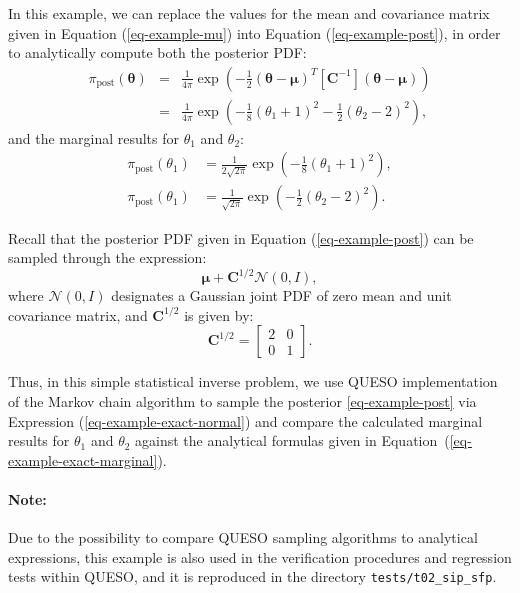 In this example, we can replace the values for the mean and covariance matrix given in Equation (\ref{eq-example-mu}) into Equation (\ref{eq-example-post}), 
in order to analytically compute both the posterior PDF:
\begin{eqnarray*}\label{eq-example-exact-post}
\pi_{\text{post}}(\boldsymbol{\theta}) & = & \frac{1}{4\pi} \exp\left(-\frac{1}{2}(\boldsymbol{\theta}-\boldsymbol{\mu})^T[\mathbf{C}^{-1}](\boldsymbol{\theta}-\boldsymbol{\mu})\right) \\
                                       & = & \frac{1}{4\pi} \exp\left( -\frac{1}{8}(\theta_1+1)^2 - \frac{1}{2}(\theta_2-2)^2\right), \label{eq-example-exact-joint}
\end{eqnarray*}
and the marginal results for $\theta_1$ and $\theta_2$:
\begin{equation}\label{eq-example-exact-marginal}
\begin{split}
\pi_{\text{post}}(\theta_1) & =  \frac{1}{2\sqrt{2\pi}} \exp\left(-\frac{1}{8}(\theta_1+1)^2 \right), \\
\pi_{\text{post}}(\theta_1) & =  \frac{1}{ \sqrt{2\pi}} \exp\left(-\frac{1}{2}(\theta_2-2)^2 \right). 
\end{split}
\end{equation}



Recall that the posterior PDF given in 
Equation (\ref{eq-example-post}) can be sampled through the expression:
\begin{equation}\label{eq-example-exact-normal}
\boldsymbol{\mu}+\mathbf{C}^{1/2}\mathcal{N}(0,I),
\end{equation}
where $\mathcal{N}(0,I)$ designates a Gaussian joint PDF of zero mean and unit covariance matrix, and
$\mathbf{C}^{1/2}$ is given by:
\begin{equation*}
\mathbf{C}^{1/2} = 
\left[\begin{array}{cc}
2 & 0 \\
0 & 1
\end{array}\right].
\end{equation*}

Thus, in this simple statistical inverse problem, we use QUESO implementation of the Markov chain 
algorithm to sample the posterior \eqref{eq-example-post} via Expression (\ref{eq-example-exact-normal}) and compare the calculated marginal results for $\theta_1$ and $\theta_2$ 
against the analytical formulas given in Equation~(\ref{eq-example-exact-marginal}). 


\paragraph*{Note:} Due to the possibility to compare QUESO sampling algorithms to analytical expressions, this example is also used in the verification procedures and regression tests within QUESO, and it is reproduced in the directory \verb+tests/t02_sip_sfp+.




